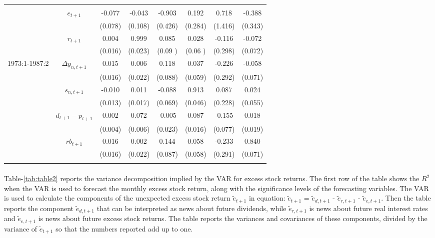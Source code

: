\documentclass[11pt]{article}
\begin{document}
\begin{center}
\begin{longtable}{rccccccc}
  \\ \hline \\
  &  $e_{t+1}$ & -0.077 & -0.043 & -0.903 & 0.192 & 0.718 & -0.388 \\ 
  & & (0.078) & (0.108) & (0.426) & (0.284) & (1.416) & (0.343) \\ 
  &  $r_{t+1}$  & 0.004 & 0.999 & 0.085 & 0.028 & -0.116 & -0.072 \\ 
  & & (0.016) & (0.023) & (0.09 ) & (0.06 ) & (0.298) & (0.072) \\ 
  1973:1-1987:2 &  $\Delta y_{n,t+1}$ & 0.015 & 0.006 & 0.118 & 0.037 & -0.226 & -0.058 \\ 
  & & (0.016) & (0.022) & (0.088) & (0.059) & (0.292) & (0.071) \\ 
  &  $s_{n,t+1}$ & -0.010 & 0.011 & -0.088 & 0.913 & 0.087 & 0.024 \\ 
  && (0.013) & (0.017) & (0.069) & (0.046) & (0.228) & (0.055) \\ 
  &  $d_{t+1}-p_{t+1}$ & 0.002 & 0.072 & -0.005 & 0.087 & -0.155 & 0.018 \\ 
  & & (0.004) & (0.006) & (0.023) & (0.016) & (0.077) & (0.019) \\ 
  &  $rb_{t+1}$ & 0.016 & 0.002 & 0.144 & 0.058 & -0.233 & 0.840 \\ 
  & & (0.016) & (0.022) & (0.087) & (0.058) & (0.291) & (0.071) \\
  \\ \hline
\end{longtable}
\end{center}

\paragraph{} Table-\ref{tab:table2} reports the variance decomposition implied by the VAR for
excess stock returns. The first row of the table shows the $R^2$ when the VAR
is used to forecast the monthly excess stock return, along with the 
significance levels of the forecasting variables. 
The VAR is used to calculate the components of the unexpected excess stock return $\tilde{e}_{t+1}$ in equation: $\tilde{e}_{t+1}$ = $\tilde{e}_{d,t+1}$ - $\tilde{e}_{r,t+1}$ - $\tilde{e}_{e,t+1}$. Then the table reports the component $\tilde{e}_{d,t+1}$ that can be interpreted as news about future dividends, while $\tilde{e}_{r,t+1}$ is news about future real interest rates and $\tilde{e}_{e,t+1}$ is news about future excess stock returns. The table reports the variances and covariances of these components, divided by the variance of $\tilde{e}_{t+1}$ so that the numbers reported add up to one.
\end{document}
